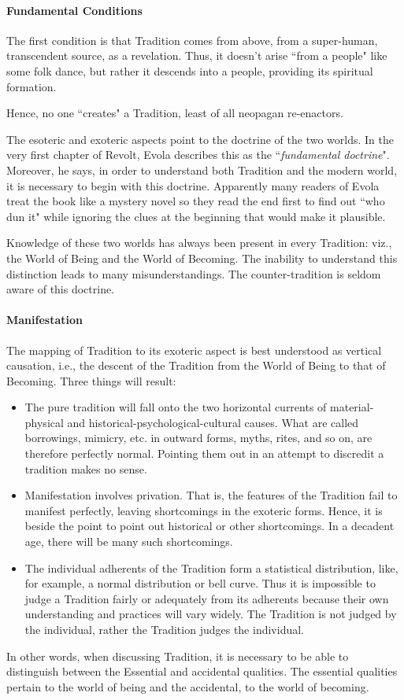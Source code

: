 \paragraph{Fundamental Conditions}
The first condition is that Tradition comes from above, from a super-human, transcendent source, as a revelation. Thus, it doesn't arise ``from a people" like some folk dance, but rather it descends into a people, providing its spiritual formation.

Hence, no one ``creates" a Tradition, least of all neopagan re-enactors.

The esoteric and exoteric aspects point to the doctrine of the two worlds. In the very first chapter of Revolt, Evola describes this as the ``\emph{fundamental doctrine}". Moreover, he says, in order to understand both Tradition and the modern world, it is necessary to begin with this doctrine. Apparently many readers of Evola treat the book like a mystery novel so they read the end first to find out ``who dun it" while ignoring the clues at the beginning that would make it plausible.

Knowledge of these two worlds has always been present in every Tradition: viz., the World of Being and the World of Becoming. The inability to understand this distinction leads to many misunderstandings. The counter-tradition is seldom aware of this doctrine.

\paragraph{Manifestation}
The mapping of Tradition to its exoteric aspect is best understood as vertical causation, i.e., the descent of the Tradition from the World of Being to that of Becoming. Three things will result:

\begin{itemize}
\item The pure tradition will fall onto the two horizontal currents of material-physical and historical-psychological-cultural causes. What are called borrowings, mimicry, etc. in outward forms, myths, rites, and so on, are therefore perfectly normal. Pointing them out in an attempt to discredit a tradition makes no sense. 
\item Manifestation involves privation. That is, the features of the Tradition fail to manifest perfectly, leaving shortcomings in the exoteric forms. Hence, it is beside the point to point out historical or other shortcomings. In a decadent age, there will be many such shortcomings. 
\item The individual adherents of the Tradition form a statistical distribution, like, for example, a normal distribution or bell curve. Thus it is impossible to judge a Tradition fairly or adequately from its adherents because their own understanding and practices will vary widely. The Tradition is not judged by the individual, rather the Tradition judges the individual. 
\end{itemize}
In other words, when discussing Tradition, it is necessary to be able to distinguish between the Essential and accidental qualities. The essential qualities pertain to the world of being and the accidental, to the world of becoming.

